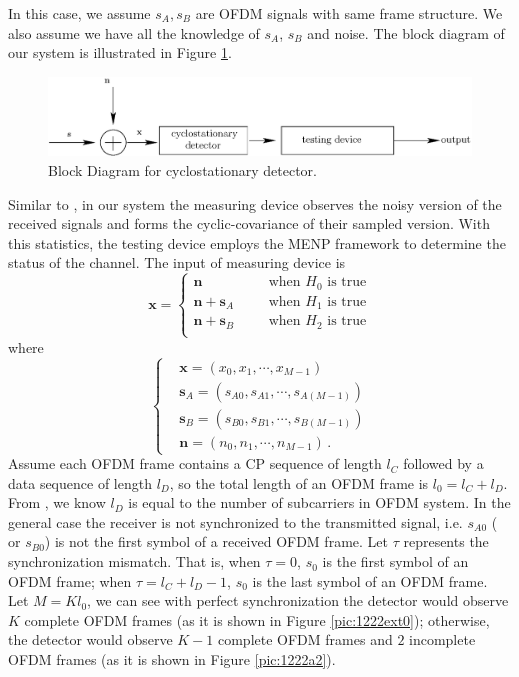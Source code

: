 In this case, we assume $s_A, s_B$ are OFDM signals with same frame structure.
We also assume we have all the knowledge of $s_A$, $s_B$ and noise.   
The block diagram of our system is illustrated in Figure \ref{pic:1222a0}.
\begin{figure}[!t]
  \centering 
  \includegraphics[width=\textwidth]{4/fig1.eps}
  \caption{Block Diagram for  cyclostationary detector.}
  \label{pic:1222a0}
\end{figure}
Similar to \cite{lunden2007spectrum, lunden2010robust}, in our system the measuring device observes the noisy version of the received signals and forms the cyclic-covariance \cite{dandawate1994statistical} of their sampled version. With this statistics, the testing device employs the MENP framework to determine the status of the channel. The input of measuring device is
\begin{equation}
  \mathbf{x} = \begin{cases}
	\mathbf{n}\;\;\;\;\;\;&\text{when $H_0$ is true}\\
	\mathbf{n}+\mathbf{s}_A\;\;\;\;\;\;&\text{when $H_1$ is true}\\
	\mathbf{n}+\mathbf{s}_B\;\;\;\;\;\;&\text{when $H_2$ is true}\\
  \end{cases}
  \label{equ:1209a1}
\end{equation}
where 
\begin{equation}
  \begin{cases}
	&\mathbf{x} = (x_0, x_1, \cdots, x_{M-1})\\
	&\mathbf{s}_A = (s_{A0}, s_{A1}, \cdots, s_{A(M-1)})\\
	&\mathbf{s}_B = (s_{B0}, s_{B1}, \cdots, s_{B(M-1)})\\
	&\mathbf{n} = (n_{0}, n_{1}, \cdots, n_{M-1})\,.
  \end{cases}
  \label{xssn}
\end{equation}
Assume each OFDM frame contains a CP sequence of length $l_C$ followed by a data sequence of length $l_D$, so the total length of an OFDM frame is $l_0 = l_C+l_D$. 
From \cite{goldsmith2005wireless}, we know $l_D$ is equal to the number of subcarriers in OFDM system. 
In the general case the receiver is not synchronized to the transmitted signal, i.e. $s_{A0}$ ( or $s_{B0}$) is not the first symbol of a received OFDM frame. Let $\tau$ represents the synchronization mismatch. That is, when $\tau = 0$, $s_0$ is the first symbol of an OFDM frame; when $\tau = l_C+l_D -1$, $s_0$ is the last symbol of an OFDM frame. Let $M = Kl_0$, we can see with perfect synchronization the detector would observe $K$ complete  OFDM frames (as it is shown in Figure \ref{pic:1222ext0}); otherwise, the detector would observe $K-1$ complete OFDM frames and $2$ incomplete OFDM frames (as it is shown in Figure \ref{pic:1222a2}). 
